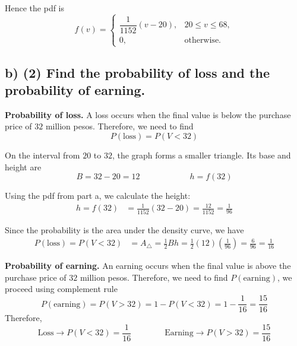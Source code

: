 	Hence the pdf is
	\[
	f(v)=
	\begin{cases}
		\dfrac{1}{1152}(v-20), & 20\le v\le 68,\\[0.2cm]
		0, & \text{otherwise.}
	\end{cases}
	\]
	
	
		
	\subsection*{b) \textbf{(2)} Find the probability of loss and the probability of earning.}
	\label{subsec:online-coffee-sales-investment-c1-b}
	\textbf{Probability of loss.} A loss occurs when the final value is below the purchase price of $32$ million pesos. Therefore, we need to find
	\[
	P(\text{loss})=P(V<32)
	\]
	
	On the interval from $20$ to $32$, the graph forms a smaller triangle. Its base and height are
	\[
	B=32-20=12
	\qquad \qquad \qquad
	h=f(32)
	\]
	
	Using the pdf from part a, we calculate the height:
	\[
	\begin{aligned}
		h=f(32)
		&=\frac{1}{1152}(32-20)
		=\frac{12}{1152}
		=\frac{1}{96}
	\end{aligned}
	\]
	
	Since the probability is the area under the density curve, we have
	\[
	\begin{aligned}
		P(\text{loss})=P(V<32)
		&=A_{\triangle}
		=\frac{1}{2}Bh
		=\frac{1}{2}(12)\left(\frac{1}{96}\right)
		=\frac{6}{96}
		=\frac{1}{16}
	\end{aligned}
	\]
	
	\textbf{Probability of earning.} An earning occurs when the final value is above the purchase price of $32$ million pesos. Therefore, we need to find $P(\text{earning})$, we proceed using complement rule
	\[
	P(\text{earning})=P(V>32)=1-P(V<32)=1-\frac{1}{16}
	=\frac{15}{16}
	\]
	Therefore,
	\[
	\text{Loss} \rightarrow P(V<32)=\frac{1}{16}
	\qquad\qquad
	\text{Earning} \rightarrow P(V>32)=\frac{15}{16}
	\]
	

	
